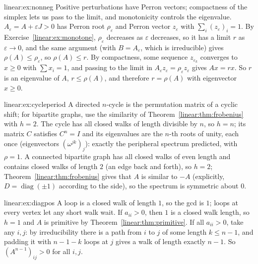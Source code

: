 \begin{solution}{linear:ex:nonneg}
\idea Positive perturbations have Perron vectors; compactness of the simplex lets us pass to the limit, and monotonicity
controls the eigenvalue.
\writeup $A_\varepsilon=A+\varepsilon J>0$ has Perron root $\rho_\varepsilon$ and Perron vector $z_\varepsilon$ with $\sum_i
(z_\varepsilon)_i=1$. By Exercise~\ref{linear:ex:monotone}, $\rho_\varepsilon$ decreases as $\varepsilon$ decreases, so it has a limit $r$
as $\varepsilon\to0$, and the same argument (with $B=A_\varepsilon$, which is irreducible) gives $\rho(A)\le\rho_\varepsilon$, so
$\rho(A)\le r$. By compactness, some sequence $z_{\varepsilon_k}$ converges to $x\ge0$ with $\sum x_i=1$, and passing to the limit in
$A_\varepsilon z_\varepsilon=\rho_\varepsilon z_\varepsilon$ gives $Ax=rx$. So $r$ is an eigenvalue of $A$, $r\le\rho(A)$, and
therefore $r=\rho(A)$ with eigenvector $x\ge0$.
\end{solution}

\begin{solution}{linear:ex:cycleperiod}
\idea A directed $n$-cycle is the permutation matrix of a cyclic shift; for bipartite graphs, use the similarity of
Theorem~\ref{linear:thm:frobenius} with $h=2$.
\writeup The cycle has all closed walks of length divisible by $n$, so $h=n$; its matrix $C$ satisfies $C^n=I$ and its
eigenvalues are the $n$-th roots of unity, each once (eigenvectors $(\omega^{jk})_j$): exactly the peripheral spectrum predicted,
with $\rho=1$. A connected bipartite graph has all closed walks of even length and contains closed walks of length $2$ (an
edge back and forth), so $h=2$; Theorem~\ref{linear:thm:frobenius} gives that $A$ is similar to $-A$ (explicitly, $D=\operatorname{diag}
(\pm1)$ according to the side), so the spectrum is symmetric about $0$.
\end{solution}

\begin{solution}{linear:ex:diagpos}
\idea A loop is a closed walk of length $1$, so the gcd is $1$; loops at every vertex let any short walk wait.
\writeup If $a_{ii}>0$, then $1$ is a closed walk length, so $h=1$ and $A$ is primitive by Theorem~\ref{linear:thm:primitive}. If
all $a_{ii}>0$, take any $i,j$: by irreducibility there is a path from $i$ to $j$ of some length $k\le n-1$, and padding it with
$n-1-k$ loops at $j$ gives a walk of length exactly $n-1$. So $(A^{n-1})_{ij}>0$ for all $i,j$.
\end{solution}

